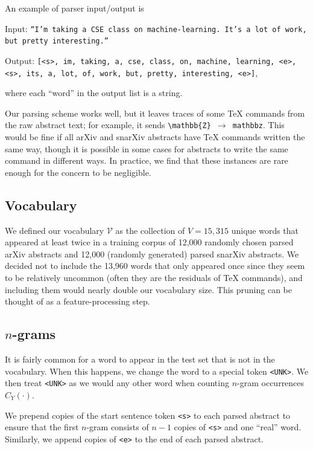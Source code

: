 \documentclass{article}
\newcommand{\V}{\mathcal{V}}
\begin{document}
An example of parser input/output is

Input: \texttt{``I'm taking a CSE class on machine-learning.\ It's a lot of work, but pretty interesting.''}

Output: \texttt{[<s>, im, taking, a, cse, class, on, machine, learning, <e>, <s>, its, a, lot, of, work, but, pretty, interesting, <e>]}, 

where each ``word'' in the output list is a string.

Our parsing scheme works well, but it leaves traces of some TeX commands from the raw abstract text; for example, it sends \texttt{\textbackslash mathbb\{Z\} $\to$ mathbbz}.
This would be fine if all arXiv and snarXiv abstracts have TeX commands written the same way, though it is possible in some cases for abstracts to write the same command in different ways. In practice, we find that these instances are rare enough for the concern to be negligible.


\subsection{Vocabulary}
We defined our vocabulary $\V$ as the collection of $V=15,315$ unique words that appeared at least twice in a training corpus of 12,000 randomly chosen parsed arXiv abstracts and 12,000 (randomly generated) parsed snarXiv abstracts.
We decided not to include the 13,960 words that only appeared once since they seem to be relatively uncommon (often they are the residuals of TeX commands), and including them would nearly double our vocabulary size.
This pruning can be thought of as a feature-processing step.


\subsection{\texorpdfstring{$n$-grams}{n-grams}}
It is fairly common for a word to appear in the test set that is not in the vocabulary.
When this happens, we change the word to a special token \texttt{<UNK>}.
We then treat \texttt{<UNK>} as we would any other word when counting $n$-gram occurrences $C_Y(\cdot)$.

We prepend copies of the start sentence token \texttt{<s>} to each parsed abstract to ensure that the first $n$-gram consists of $n-1$ copies of \texttt{<s>} and one ``real'' word.
Similarly, we append copies of \texttt{<e>} to the end of each parsed abstract.





\nocite{sahami1998bayesian,ngram-cat,textclass,trivedi2016study,cvxpy,cvxpy_rewriting}



\end{document}
